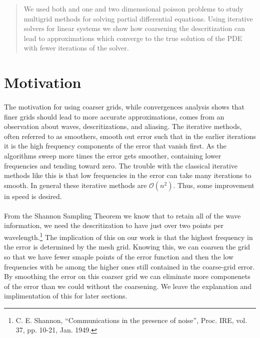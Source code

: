 \documentclass[pdftex,12pt,a4paper]{article}
\begin{document}


\vspace{2 cm}

\begin{abstract}
    We used both and one and two dimenssional poisson problems to study multigrid methods for solving partial differential equations. Using iterative solvers for linear systems we show how coarsening the descritization can lead to approximations which converge to the true solution of the PDE with fewer iterations of the solver. 
\end{abstract}

\section{Motivation}
   
    \paragraph*{} The motivation for using coarser grids, while convergences analysis shows that finer grids should lead to more accurate approximations, comes from an observation about waves, descritizations, and aliasing. The iterative methods, often referred to as smoothers, smooth out error such that in the earlier iterations it is the high frequency components of the error that vanish first. As the algorithms sweep more times the error gets smoother, containing lower frequencies and tending toward zero. The trouble with the classical iterative methods like this is that low frequencies in the error can take many iterations to smooth. In general these iterative methods are $\mathcal{O}(n^2)$. Thus, some improvement in speed is desired.

    \paragraph*{} From the Shannon Sampling Theorem we know that to retain all of the wave information, we need the descritization to have just over two points per wavelength.\footnote{C. E. Shannon, ``Communications in the presence of noise'', Proc. IRE, vol. 37, pp. 10-21, Jan. 1949.} The implication of this on our work is that the highest frequency in the error is determined by the mesh grid. Knowing this, we can coarsen the grid so that we have fewer smaple points of the error function and then the low frequencies with be among the higher ones still contained in the coarse-grid error. By smoothing the error on this coarser grid we can eliminate more componenets of the error than we could without the coarsening. We leave the explanation and implimentation of this for later sections.
\end{document}
